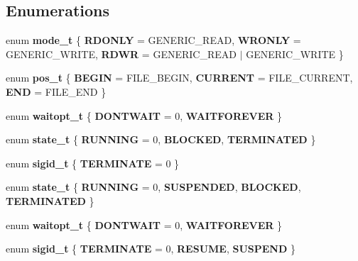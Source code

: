\subsection*{Enumerations}
\begin{CompactItemize}
\item 
enum {\bf mode\_\-t} \{ {\bf RDONLY} =  GENERIC\_\-READ, 
{\bf WRONLY} =  GENERIC\_\-WRITE, 
{\bf RDWR} =  GENERIC\_\-READ $|$ GENERIC\_\-WRITE
 \}
\item 
enum {\bf pos\_\-t} \{ {\bf BEGIN} =  FILE\_\-BEGIN, 
{\bf CURRENT} =  FILE\_\-CURRENT, 
{\bf END} =  FILE\_\-END
 \}
\item 
enum {\bf waitopt\_\-t} \{ {\bf DONTWAIT} =  0, 
{\bf WAITFOREVER}
 \}
\item 
enum {\bf state\_\-t} \{ {\bf RUNNING} =  0, 
{\bf BLOCKED}, 
{\bf TERMINATED}
 \}
\item 
enum {\bf sigid\_\-t} \{ {\bf TERMINATE} =  0
 \}
\item 
enum {\bf state\_\-t} \{ {\bf RUNNING} =  0, 
{\bf SUSPENDED}, 
{\bf BLOCKED}, 
{\bf TERMINATED}
 \}
\item 
enum {\bf waitopt\_\-t} \{ {\bf DONTWAIT} =  0, 
{\bf WAITFOREVER}
 \}
\item 
enum {\bf sigid\_\-t} \{ {\bf TERMINATE} =  0, 
{\bf RESUME}, 
{\bf SUSPEND}
 \}
\end{CompactItemize}
